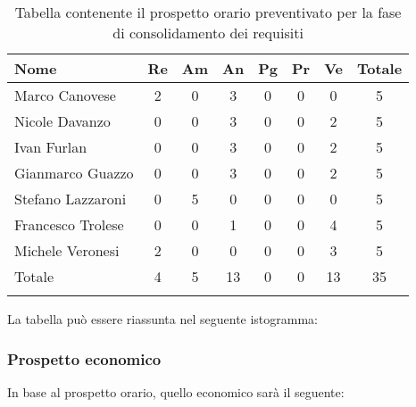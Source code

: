 			\begin{longtable}{|l|c|c|c|c|c|c|c|}
				\hline
				\rowcolor{lighter-grayer}
				\textbf{Nome} & \textbf{Re} & \textbf{Am} & \textbf{An} & \textbf{Pg}  & \textbf{Pr}   & \textbf{Ve} & \textbf{Totale} \\
				\hline
				\endfirsthead
				
				\hline
				Marco Canovese & 2 & 0 & 3 & 0 & 0 & 0 & 5\\
				\hline
				\hline
				Nicole Davanzo & 0 & 0 & 3 & 0 & 0 & 2 & 5\\
				\hline
				\hline
				Ivan Furlan & 0 & 0 & 3 & 0 & 0 & 2 & 5\\
				\hline
				\hline
				Gianmarco Guazzo & 0 & 0 & 3 & 0 & 0 & 2 & 5\\
				\hline
				\hline
				Stefano Lazzaroni & 0 & 5 & 0 & 0 & 0 & 0 & 5\\
				\hline
				\hline
				Francesco Trolese & 0 & 0 & 1 & 0 & 0 & 4 & 5\\
				\hline
				\hline
				Michele Veronesi & 2 & 0 & 0 & 0 & 0 & 3 & 5\\
				\hline 
				\hline
				Totale & 4 & 5 & 13 & 0 & 0 & 13 & 35\\
				\hline 
				\caption{Tabella contenente il prospetto orario preventivato per la fase di consolidamento dei requisiti}
			\end{longtable}

		
			La tabella può essere riassunta nel seguente istogramma:
		
		
			\subsubsection{Prospetto economico}
			In base al prospetto orario, quello economico sarà il seguente: 
			
